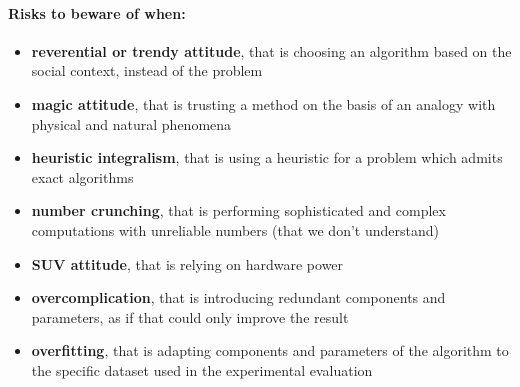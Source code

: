 \paragraph{Risks to beware of when:}
\begin{itemize}
	\item \textbf{reverential or trendy attitude}, that is choosing an algorithm based on the social context, instead of the problem
	\item \textbf{magic attitude}, that is trusting a method on the basis of an analogy with physical and natural phenomena
	\item \textbf{heuristic integralism}, that is using a heuristic for a problem which admits exact algorithms
	\item \textbf{number crunching}, that is performing sophisticated and complex computations with unreliable numbers (that we don't understand)
	\item \textbf{SUV attitude}, that is relying on hardware power
	\item \textbf{overcomplication}, that is introducing redundant components and parameters, as if that could only improve the result
	\item \textbf{overfitting}, that is adapting components and parameters of the algorithm to the specific dataset used in the experimental evaluation
\end{itemize}


\newpage